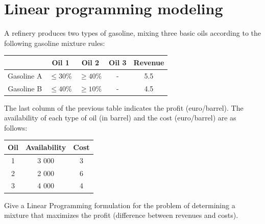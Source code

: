 \documentclass[12pt, a4paper]{report}
\newtheorem[style=M,bodystyle=\normalfont]{theorem}{Theorem}
\newtheorem[style=M,bodystyle=\normalfont]{corollary}{Corollary}
\newtheorem[style=M,bodystyle=\normalfont]{lemma}{Lemma}
\newtheorem[style=M,bodystyle=\normalfont]{definition}{Definition}
\begin{document}
    \newpage

    \section{Linear programming modeling}
        A refinery produces two types of gasoline, mixing three basic oils according to the following gasoline mixture rules:
        \begin{table}[H]
            \centering
            \begin{tabular}{c|ccc|c|}
            \cline{2-5}
            \textbf{}                        & \textbf{Oil 1} & \textbf{Oil 2} & \textbf{Oil 3} & \textbf{Revenue} \\ \hline
            \multicolumn{1}{|c|}{Gasoline A} & $\leq 30\%$    & $\geq 40\%$    & -              & 5.5              \\
            \multicolumn{1}{|c|}{Gasoline B} & $\leq 40\%$    & $\geq 10\%$    & -              & 4.5              \\ \hline
            \end{tabular}
        \end{table}
        The last column of the previous table indicates the profit (euro/barrel). The availability of each type of oil (in barrel) and the cost (euro/barrel) are as follows:
        \begin{table}[H]
            \centering
            \begin{tabular}{c|c|c}
            \textbf{Oil} & \textbf{Availability} & \textbf{Cost} \\ \hline
            1            & 3 000                 & 3             \\
            2            & 2 000                 & 6             \\
            3            & 4 000                 & 4            
            \end{tabular}
        \end{table}
        Give a Linear Programming formulation for the problem of determining a mixture that maximizes the profit (difference between revenues and costs).
\end{document}
